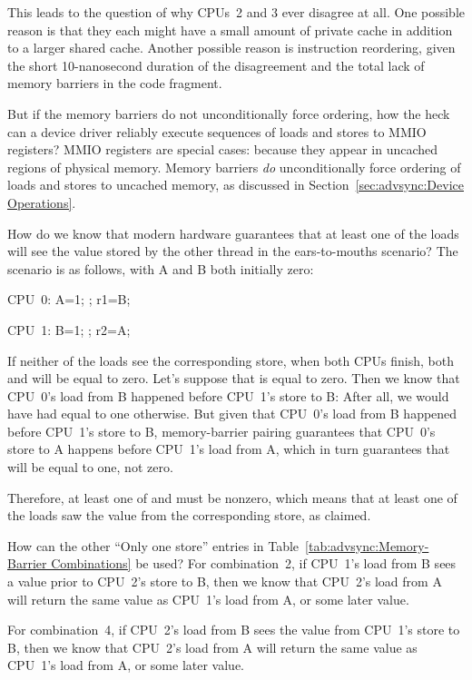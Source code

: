 \begin{enumerate}
	This leads to the question of why CPUs~2 and 3 ever disagree
	at all.
	One possible reason is that they each might have a small amount
	of private cache in addition to a larger shared cache.
	Another possible reason is instruction reordering, given the
	short 10-nanosecond duration of the disagreement and the
	total lack of memory barriers in the code fragment.

\QuickQ{}
	But if the memory barriers do not unconditionally force
	ordering, how the heck can a device driver reliably execute
	sequences of loads and stores to MMIO registers?
\QuickA{}
	MMIO registers are special cases: because they appear
	in uncached regions of physical memory.
	Memory barriers \emph{do} unconditionally force ordering
	of loads and stores to uncached memory, as discussed in
	Section~\ref{sec:advsync:Device Operations}.

\QuickQ{}
	How do we know that modern hardware guarantees that at least
	one of the loads will see the value stored by the other thread
	in the ears-to-mouths scenario?
\QuickA{}
	The scenario is as follows, with A and B both initially zero:

	CPU~0: A=1; ; r1=B;

	CPU~1: B=1; ; r2=A;

	If neither of the loads see the corresponding store, when both
	CPUs finish, both  and  will be equal to zero.
	Let's suppose that  is equal to zero.
	Then we know that CPU~0's load from B happened before CPU~1's
	store to B: After all, we would have had  equal to one
	otherwise.
	But given that CPU~0's load from B happened before CPU~1's store
	to B, memory-barrier pairing guarantees that CPU~0's store to A
	happens before CPU~1's load from A, which in turn guarantees that
	 will be equal to one, not zero.

	Therefore, at least one of  and  must be nonzero,
	which means that at least one of the loads saw the value from
	the corresponding store, as claimed.

\QuickQ{}
	How can the other ``Only one store'' entries in
	Table~\ref{tab:advsync:Memory-Barrier Combinations}
	be used?
\QuickA{}
	For combination~2, if CPU~1's load from B sees a value prior
	to CPU~2's store to B, then we know that CPU~2's load from A
	will return the same value as CPU~1's load from A, or some later
	value.

	For combination~4, if CPU~2's load from B sees the value from
	CPU~1's store to B, then we know that CPU~2's load from A
	will return the same value as CPU~1's load from A, or some later
	value.


\end{enumerate}
